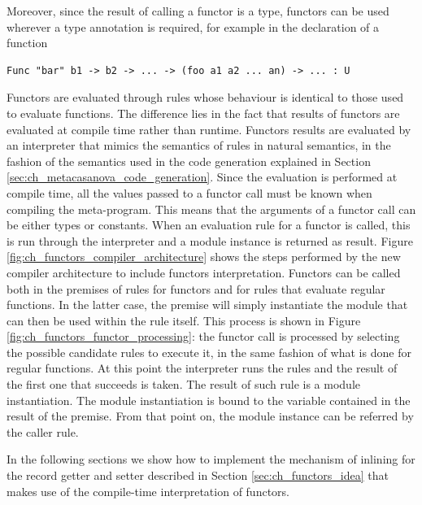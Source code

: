 \noindent
Moreover, since the result of calling a functor is a type, functors can be used wherever a type annotation is required, for example in the declaration of a function

\begin{lstlisting}
Func "bar" b1 -> b2 -> ... -> (foo a1 a2 ... an) -> ... : U
\end{lstlisting}

\noindent
Functors are evaluated through rules whose behaviour is identical to those used to evaluate functions. The difference lies in the fact that results of functors are evaluated at compile time rather than runtime. Functors results are evaluated by an interpreter that mimics the semantics of rules in natural semantics, in the fashion of the semantics used in the code generation explained in Section \ref{sec:ch_metacasanova_code_generation}. Since the evaluation is performed at compile time, all the values passed to a functor call must be known when compiling the meta-program. This means that the arguments of a functor call can be either types or constants. When an evaluation rule for a functor is called, this is run through the interpreter and a module instance is returned as result. Figure \ref{fig:ch_functors_compiler_architecture} shows the steps performed by the new compiler architecture to include functors interpretation. Functors can be called both in the premises of rules for functors and for rules that evaluate regular functions. In the latter case, the premise will simply instantiate the module that can then be used within the rule itself. This process is shown in Figure \ref{fig:ch_functors_functor_processing}: the functor call is processed by selecting the possible candidate rules to execute it, in the same fashion of what is done for regular functions. At this point the interpreter runs the rules and the result of the first one that succeeds is taken. The result of such rule is a module instantiation. The module instantiation is bound to the variable contained in the result of the premise. From that point on, the module instance can be referred by the caller rule.

In the following sections we show how to implement the mechanism of inlining for the record getter and setter described in Section \ref{sec:ch_functors_idea} that makes use of the compile-time interpretation of functors.

